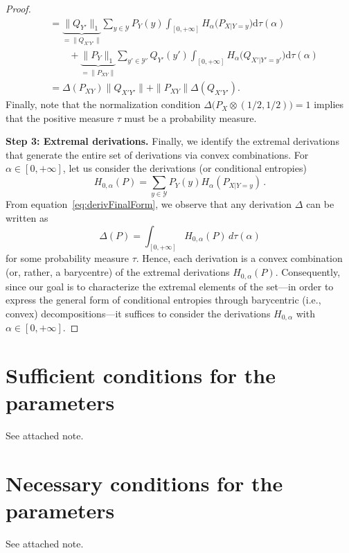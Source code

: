 \documentclass[aps,pra,11pt,onecolumn,nofootinbib,tightenlines]{revtex4-2}
\theoremstyle{definition}
\def \d {\mathrm{d}}
\newcommand{\Y}{\mathcal{Y}}
\newcommand{\mc}[1]{\mathcal{#1}}
\begin{document}
\begin{proof}
\begin{align}
&=\underbrace{\|Q_{Y'}\|_1}_{=\|Q_{X'Y'}\|}\sum_{y\in \Y}P_Y(y)\int_{[0,+\infty]}H_\alpha\big(P_{X|Y=y}\big)\d\tau(\alpha)\\
&\qquad +\underbrace{\|P_Y\|_1}_{=\|P_{XY}\|}\sum_{y'\in \Y'}Q_{Y'}(y')\int_{[0,+\infty]}H_\alpha\big(Q_{X'|Y'=y'}\big)\d\tau(\alpha)\\
&=\Delta(P_{XY})\|Q_{X'Y'}\|+\|P_{XY}\|\Delta(Q_{X'Y'}).
\end{align}
Finally, note that the normalization condition $\Delta\big(P_X\otimes(1/2,1/2)\big)=1$ implies that the positive measure $\tau$ must be a probability measure. 


\medskip
\noindent \noindent\textbf{Step 3: Extremal derivations.} Finally, we identify the extremal derivations that generate the entire set of derivations via convex combinations. For $\alpha\in[0,+\infty]$, let us consider the derivations (or conditional entropies)
\begin{equation}\label{eq:ExtDerivation proof}
H_{0,\alpha}(P)=\sum_{y\in\mc Y} P_Y(y)H_\alpha(P_{X|Y=y})\,.
\end{equation}
From equation~\eqref{eq:derivFinalForm}, we observe that any derivation \(\Delta\) can be written as
\begin{equation}
    \Delta(P) = \int_{[0,+\infty]} H_{0,\alpha}(P)\, d\tau(\alpha) 
\end{equation}
for some probability measure \(\tau\). Hence, each derivation is a convex combination (or, rather, a barycentre) of the extremal derivations \(H_{0,\alpha}(P)\). 
Consequently, since our goal is to characterize the extremal elements of the set—in order to express the general form of conditional entropies through barycentric (i.e., convex) decompositions—it suffices to consider the derivations
\(H_{0,\alpha}\) with \(\alpha \in [0,+\infty]\).
\end{proof}


\section{Sufficient conditions for the parameters}
See attached note.

\section{Necessary conditions for the parameters}
See attached note.
\end{document}
